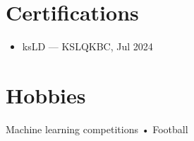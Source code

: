 \documentclass[10pt,letterpaper]{article}
\begin{document}
\begin{paracol}{2}
\begin{rightcolumn}
\section*{Certifications}
\begin{itemize}
  \item ksLD  — KSLQKBC, Jul 2024
\end{itemize}

\section*{Hobbies}
Machine learning competitions • Football

\end{rightcolumn}
\end{paracol}
\end{document}
